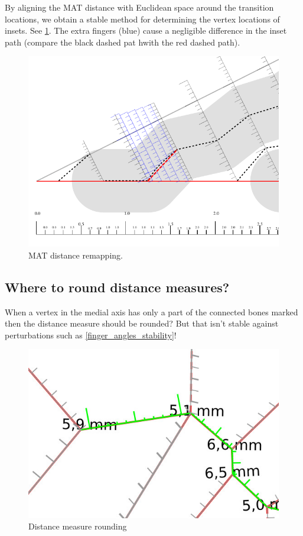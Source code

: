 By aligning the MAT distance with Euclidean space around the transition locations, we obtain a stable method for determining the vertex locations of insets.
See \cref{distance_rounding_transition}.
The extra fingers (blue) cause a negligible difference in the inset path (compare the black dashed pat hwith the red dashed path).

\begin{figure}[H]
\centering
\includegraphics[width=.9\columnwidth]{sources/method/distance_rounding_transition.pdf}
\caption{MAT distance remapping.}
\label{distance_rounding_transition}
\end{figure}





\subsection{Where to round distance measures?}
When a vertex in the medial axis has only a part of the connected bones marked then the distance measure should be rounded?
But that isn't stable against perturbations such as \cref{finger_angles_stability}!


\begin{figure}[H]
\centering
\includegraphics[width=.6\columnwidth]{sources/method/rounded_dist_measures.jpg}
\caption{Distance measure rounding}
\label{rounded_dist_measures}
\end{figure}

